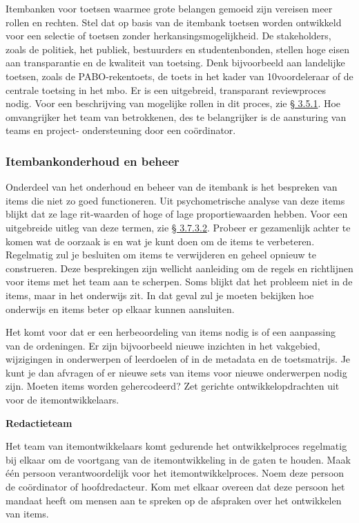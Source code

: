 \documentclass[
]{book}
\begin{document}
Itembanken voor toetsen waarmee grote belangen gemoeid zijn vereisen meer rollen en rechten. Stel dat op basis van de itembank toetsen worden ontwikkeld voor een selectie of toetsen zonder herkansingsmogelijkheid. De stakeholders, zoals de politiek, het publiek, bestuurders en studentenbonden, stellen hoge eisen aan transparantie en de kwaliteit van toetsing. Denk bijvoorbeeld aan landelijke toetsen, zoals de PABO-rekentoets, de toets in het kader van 10voordeleraar of de centrale toetsing in het mbo. Er is een uitgebreid, transparant reviewproces nodig. Voor een beschrijving van mogelijke rollen in dit proces, zie \protect\hyperlink{rollen-en-rechten}{§ 3.5.1}. Hoe omvangrijker het team van betrokkenen, des te belangrijker is de aansturing van teams en project- ondersteuning door een coördinator.

\hypertarget{itembankonderhoud-en-beheer}{%
\subsubsection{Itembankonderhoud en beheer}\label{itembankonderhoud-en-beheer}}

Onderdeel van het onderhoud en beheer van de itembank is het bespreken van items die niet zo goed functioneren. Uit psychometrische analyse van deze items blijkt dat ze lage rit-waarden of hoge of lage proportiewaarden hebben. Voor een uitgebreide uitleg van deze termen, zie \protect\hyperlink{psychometrische-data}{§ 3.7.3.2}. Probeer er gezamenlijk achter te komen wat de oorzaak is en wat je kunt doen om de items te verbeteren. Regelmatig zul je besluiten om items te verwijderen en geheel opnieuw te construeren. Deze besprekingen zijn wellicht aanleiding om de regels en richtlijnen voor items met het team aan te scherpen. Soms blijkt dat het probleem niet in de items, maar in het onderwijs zit. In dat geval zul je moeten bekijken hoe onderwijs en items beter op elkaar kunnen aansluiten.

Het komt voor dat er een herbeoordeling van items nodig is of een aanpassing van de ordeningen. Er zijn bijvoorbeeld nieuwe inzichten in het vakgebied, wijzigingen in onderwerpen of leerdoelen of in de metadata en de toetsmatrijs. Je kunt je dan afvragen of er nieuwe sets van items voor nieuwe onderwerpen nodig zijn. Moeten items worden gehercodeerd? Zet gerichte ontwikkelopdrachten uit voor de itemontwikkelaars.

\textbf{Redactieteam}

Het team van itemontwikkelaars komt gedurende het ontwikkelproces regelmatig bij elkaar om de voortgang van de itemontwikkeling in de gaten te houden. Maak één persoon verantwoordelijk voor het itemontwikkelproces. Noem deze persoon de coördinator of hoofdredacteur. Kom met elkaar overeen dat deze persoon het mandaat heeft om mensen aan te spreken op de afspraken over het ontwikkelen van items.
\end{document}
